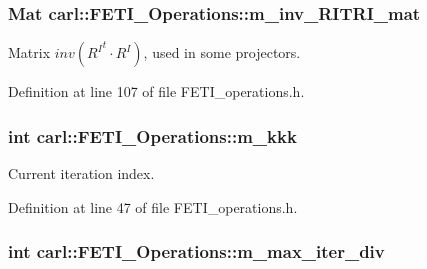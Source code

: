\subsubsection[{m\+\_\+inv\+\_\+\+R\+I\+T\+R\+I\+\_\+mat}]{\setlength{\rightskip}{0pt plus 5cm}Mat carl\+::\+F\+E\+T\+I\+\_\+\+Operations\+::m\+\_\+inv\+\_\+\+R\+I\+T\+R\+I\+\_\+mat\hspace{0.3cm}{\ttfamily [protected]}}\label{classcarl_1_1_f_e_t_i___operations_a5b61754f3ea2e4c674fd37f18ec0014b}


Matrix $ inv({R^I}^t \cdot R^I)$, used in some projectors. 



Definition at line 107 of file F\+E\+T\+I\+\_\+operations.\+h.

\hypertarget{classcarl_1_1_f_e_t_i___operations_aae9d8e6d2d0436cda061359f1602b096}{}
\subsubsection[{m\+\_\+kkk}]{\setlength{\rightskip}{0pt plus 5cm}int carl\+::\+F\+E\+T\+I\+\_\+\+Operations\+::m\+\_\+kkk\hspace{0.3cm}{\ttfamily [protected]}}\label{classcarl_1_1_f_e_t_i___operations_aae9d8e6d2d0436cda061359f1602b096}


Current iteration index. 



Definition at line 47 of file F\+E\+T\+I\+\_\+operations.\+h.

\hypertarget{classcarl_1_1_f_e_t_i___operations_ab8f236399e5565019be7dc8825bc00df}{}
\subsubsection[{m\+\_\+max\+\_\+iter\+\_\+div}]{\setlength{\rightskip}{0pt plus 5cm}int carl\+::\+F\+E\+T\+I\+\_\+\+Operations\+::m\+\_\+max\+\_\+iter\+\_\+div\hspace{0.3cm}{\ttfamily [protected]}}\label{classcarl_1_1_f_e_t_i___operations_ab8f236399e5565019be7dc8825bc00df}



